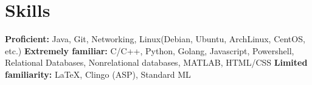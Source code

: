 \section{Skills}
\textbf{Proficient:} Java, Git, Networking, Linux(Debian, Ubuntu, ArchLinux, CentOS, etc.) \newline
\textbf{Extremely familiar:} C/C++, Python, Golang, Javascript, Powershell, Relational %
Databases, Nonrelational databases, MATLAB, HTML/CSS \newline
\textbf{Limited familiarity:} \LaTeX, Clingo (ASP), Standard ML
